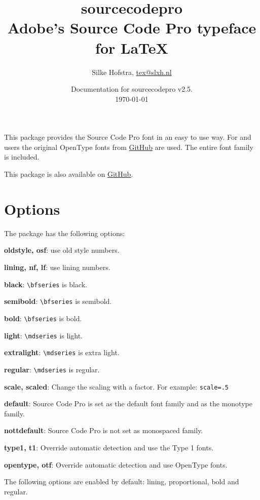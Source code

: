 \documentclass[10pt,a4paper,english]{article}
\title{\bfseries
	\Huge sourcecodepro\\
	\Large Adobe's Source Code Pro typeface for \LaTeX
}
\author{Silke Hofstra, \href{mailto:tex@slxh.nl}{tex@slxh.nl}}
\date{Documentation for sourcecodepro v2.5.\\ \today}
\begin{document}
\maketitle
\begin{multicols}{2}
This package provides the Source Code Pro font in an easy to use way. For  and  users the original OpenType fonts from \href{https://github.com/adobe-fonts/source-code-pro}{GitHub} are used. The entire font family is included.

This package is also available on \href{https://github.com/silkeh/latex-sourcecodepro}{GitHub}.

\section{Options}
The package has the following options:
\begin{itemize*}
	\item \textbf{oldstyle, osf}:  use old style numbers.
	\item \textbf{lining, nf, lf}: use lining numbers.
	\item \textbf{black}:          \texttt{\textbackslash bfseries} is black.
	\item \textbf{semibold}:       \texttt{\textbackslash bfseries} is semibold.
	\item \textbf{bold}:           \texttt{\textbackslash bfseries} is bold.
	\item \textbf{light}:          \texttt{\textbackslash mdseries} is light.
	\item \textbf{extralight}:     \texttt{\textbackslash mdseries} is extra light.
	\item \textbf{regular}:        \texttt{\textbackslash mdseries} is regular.
	\item \textbf{scale, scaled}:  Change the scaling with a factor. For example:  \texttt{scale=.5}
	\item \textbf{default}:        Source Code Pro is set as the default font family and as the monotype family.
	\item \textbf{nottdefault}:    Source Code Pro is not set as monospaced family.
	\item \textbf{type1, t1}:      Override automatic detection and use the Type 1 fonts.
	\item \textbf{opentype, otf}:  Override automatic detection and use OpenType fonts.
\end{itemize*}
The following options are enabled by default: lining, proportional, bold and regular.


\end{multicols}
\end{document}

